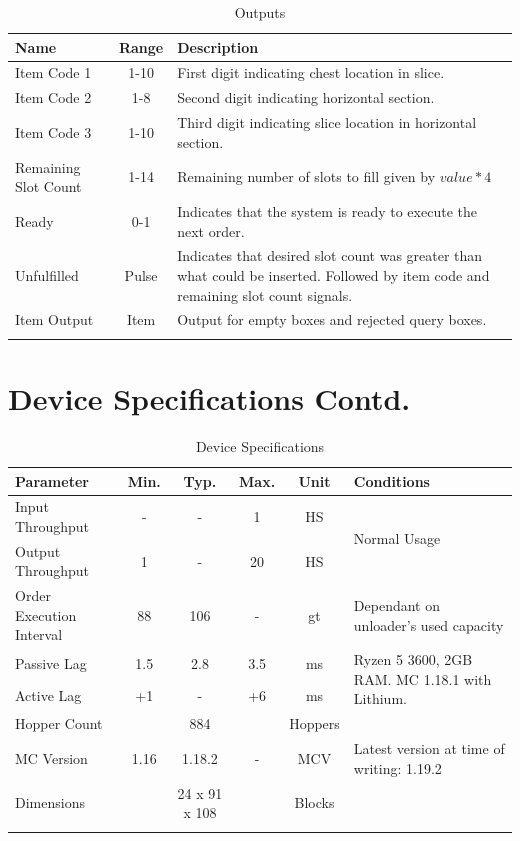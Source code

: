 \documentclass[10pt]{datasheet}
\begin{document}
\begin{table}[h]
    \caption{Outputs}
    \begin{tabularx}{\textwidth}{l | c | X}
        \thickhline
        \textbf{Name} & \textbf{Range} & \textbf{Description} \\
        \hline
        Item Code 1 & 1-10 & First digit indicating chest location in slice. \\
        Item Code 2 & 1-8 & Second digit indicating horizontal section. \\
        Item Code 3 & 1-10 & Third digit indicating slice location in horizontal section. \\
        \hline
        Remaining Slot Count & 1-14 & Remaining number of slots to fill given by $value*4$\\
        \hline
        Ready & 0-1 & Indicates that the system is ready to execute the next order.\\
        \hline
        Unfulfilled & Pulse & Indicates that desired slot count was greater than what could be inserted. Followed by item code and remaining slot count signals. \\
        \hline
        Item Output & Item & Output for empty boxes and rejected query boxes. \\
        \thickhline
\end{tabularx}
\end{table}
\newpage
\section{Device Specifications Contd.}
\begin{table}[h]
    \caption{Device Specifications}
    \begin{tabularx}{\textwidth}{l | c c c | c | X}
        \thickhline
        \textbf{Parameter} & \textbf{Min.} & \textbf{Typ.} & \textbf{Max.} &
        \textbf{Unit} & \textbf{Conditions} \\
        \hline
        Input Throughput  & - & - & 1 & HS & \multirow{2}{*}{Normal Usage} \\
        Output Throughput  & 1 & - & 20 & HS & \\
        \hline
        Order Execution Interval & 88 & 106 & - & gt & Dependant on unloader's used capacity\\
        \hline
        Passive Lag & 1.5 & 2.8 & 3.5 & ms & \multirow{2}{6cm}{Ryzen 5 3600, 2GB RAM. MC 1.18.1 with Lithium.} \\
        Active Lag & +1 & - & +6 & ms & \\
        \hline
        Hopper Count & & 884 & & Hoppers & \\
        \hline
        MC Version & 1.16 & 1.18.2 & - & MCV & Latest version at time of writing: 1.19.2\\
        \hline
        Dimensions & & 24 x 91 x 108 & & Blocks & \\
        \thickhline
\end{tabularx}
\end{table}
\end{document}
